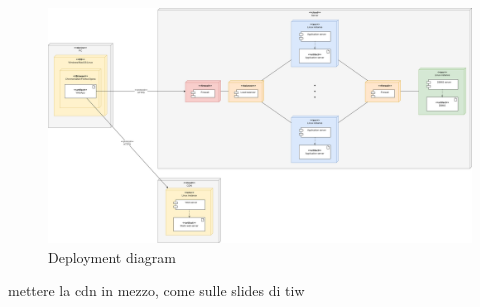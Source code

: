 \begin{figure}[ht]
    \centering
    \includegraphics[width=\textwidth]{images/diagrams/deployment_view.png}
    \caption{Deployment diagram}
    \label{fig:deployment_diagram}
\end{figure}

{\color{red} mettere la cdn in mezzo, come sulle slides di tiw}

